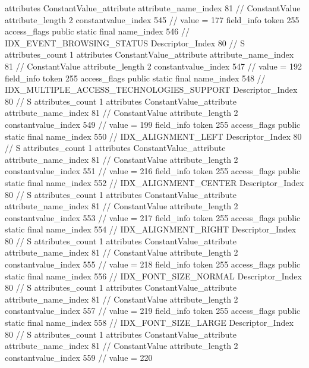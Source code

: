 {{{{{				attributes {
				ConstantValue_attribute {
					attribute_name_index	81		// ConstantValue
					attribute_length	2
					constantvalue_index	545		// value = 177
				}
				}
			}
			field_info {
				token	255
				access_flags	public static final
				name_index	546		// IDX_EVENT_BROWSING_STATUS
				Descriptor_Index	80		// S
				attributes_count	1
				attributes {
				ConstantValue_attribute {
					attribute_name_index	81		// ConstantValue
					attribute_length	2
					constantvalue_index	547		// value = 192
				}
				}
			}
			field_info {
				token	255
				access_flags	public static final
				name_index	548		// IDX_MULTIPLE_ACCESS_TECHNOLOGIES_SUPPORT
				Descriptor_Index	80		// S
				attributes_count	1
				attributes {
				ConstantValue_attribute {
					attribute_name_index	81		// ConstantValue
					attribute_length	2
					constantvalue_index	549		// value = 199
				}
				}
			}
			field_info {
				token	255
				access_flags	public static final
				name_index	550		// IDX_ALIGNMENT_LEFT
				Descriptor_Index	80		// S
				attributes_count	1
				attributes {
				ConstantValue_attribute {
					attribute_name_index	81		// ConstantValue
					attribute_length	2
					constantvalue_index	551		// value = 216
				}
				}
			}
			field_info {
				token	255
				access_flags	public static final
				name_index	552		// IDX_ALIGNMENT_CENTER
				Descriptor_Index	80		// S
				attributes_count	1
				attributes {
				ConstantValue_attribute {
					attribute_name_index	81		// ConstantValue
					attribute_length	2
					constantvalue_index	553		// value = 217
				}
				}
			}
			field_info {
				token	255
				access_flags	public static final
				name_index	554		// IDX_ALIGNMENT_RIGHT
				Descriptor_Index	80		// S
				attributes_count	1
				attributes {
				ConstantValue_attribute {
					attribute_name_index	81		// ConstantValue
					attribute_length	2
					constantvalue_index	555		// value = 218
				}
				}
			}
			field_info {
				token	255
				access_flags	public static final
				name_index	556		// IDX_FONT_SIZE_NORMAL
				Descriptor_Index	80		// S
				attributes_count	1
				attributes {
				ConstantValue_attribute {
					attribute_name_index	81		// ConstantValue
					attribute_length	2
					constantvalue_index	557		// value = 219
				}
				}
			}
			field_info {
				token	255
				access_flags	public static final
				name_index	558		// IDX_FONT_SIZE_LARGE
				Descriptor_Index	80		// S
				attributes_count	1
				attributes {
				ConstantValue_attribute {
					attribute_name_index	81		// ConstantValue
					attribute_length	2
					constantvalue_index	559		// value = 220
				}
				}
}}}}}
